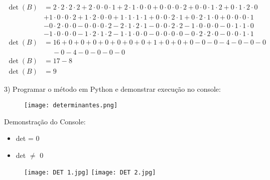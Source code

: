 \documentclass[12pt]{article}
\begin{document}
\[
\begin{aligned}
    \operatorname{det}(B) & = 2 \cdot 2 \cdot 2 \cdot 2 + 2 \cdot 0 \cdot 0 \cdot 1 + 2 \cdot 1 \cdot 0 
    \cdot 0 + 0 \cdot 0 \cdot 0 \cdot 2 + 0 \cdot 0 \cdot 1 \cdot 2 + 0 \cdot 1 \cdot 2 \cdot 0 \\
    &  + 1 \cdot 0 \cdot 0 \cdot 2 + 1 \cdot 2 \cdot 0 \cdot 0 + 1 \cdot 1 \cdot 1 \cdot 1 + 0 \cdot 0 
    \cdot 2 \cdot 1 + 0 \cdot 2 \cdot 1 \cdot 0 + 0 \cdot 0 \cdot 0 \cdot 1 \\
    & - 0 \cdot 2 \cdot 0 \cdot 0 - 0 \cdot 0 \cdot 0 \cdot 2 - 2 \cdot 1 \cdot 2 \cdot 1 - 0 \cdot 0 
    \cdot 2 \cdot 2 - 1 \cdot 0 \cdot 0 \cdot 0 - 0 \cdot 1 \cdot 1 \cdot 0 \\
    & - 1 \cdot 0 \cdot 0 \cdot 0 - 1 \cdot 2 \cdot 1 \cdot 2 - 1 \cdot 1 \cdot 0 \cdot 0 - 0 \cdot 0 
    \cdot 0 \cdot 0 - 0 \cdot 2 \cdot 2 \cdot 0 - 0 \cdot 0 \cdot 1 \cdot 1\\ 
    \operatorname{det}(B) & = 16 + 0 + 0 + 0 + 0 + 0 + 0 + 0 + 1 + 0 + 0 + 0 - 0 - 0 - 4 - 0 - 0 - 0 \\ 
    & \quad \ - 0 - 4 - 0 - 0 - 0 - 0 \\
    \operatorname{det}(B) & = 17-8 \\
    \operatorname{det}(B) & = 9
\end{aligned}
\]

3) Programar o m\'{e}todo em Python e demonstrar execu\c{c}\~{a}o no console:
\\

\begin{figure} [h]
    \texttt{[image: determinantes.png]}
\end{figure}

\newpage
Demonstra\c{c}\~{a}o do Console:
\begin{multicols}{2}
\begin{itemize}
    \item det = 0
    \item det $\neq$ 0
\end{itemize}
\end{multicols}
\begin{figure} [h]
    \texttt{[image: DET 1.jpg]}
    \texttt{[image: DET 2.jpg]}
\end{figure}
\end{document}
